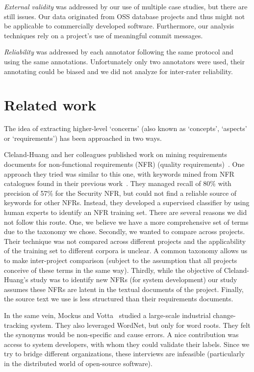 \documentclass[]{sig-alternate}
\begin{document}
\emph{External validity} was addressed by our use of multiple case studies, but there are still issues. 
Our data originated from OSS database projects and thus might not be applicable to commercially developed software. 
Furthermore, our analysis techniques rely on a project's use of meaningful commit messages. 

\emph{Reliability} was addressed by each annotator following the same protocol and using the same annotations. 
Unfortunately only two annotators were used, their annotating could be biased and we did not analyze for inter-rater reliability.


\section{Related work}
\label{sec:related}
The idea of extracting higher-level `concerns' (also known as `concepts', `aspects' or `requirements') has been approached in two ways. 

Cleland-Huang and her colleagues published work on mining requirements documents for non-functional requirements (NFR) (quality requirements)~\cite{Cleland-Huang2006}. One approach they tried was similar to this one, with keywords mined from NFR catalogues found in their previous work~\cite{chung99}. They managed recall of 80\% with precision of 57\% for the Security NFR, but could not find a reliable source of keywords for other NFRs. Instead, they developed a supervised classifier by using human experts to identify an NFR training set. There are several reasons we did not follow this route. One, we believe we have a more comprehensive set of terms due to the taxonomy we chose. Secondly, we wanted to compare across projects. Their technique was not compared across different projects and the applicability of the training set to different corpora is unclear. A common taxonomy allows us to make inter-project comparison (subject to the assumption that all projects conceive of these terms in the same way). Thirdly, while the objective of Cleland-Huang's study was to identify new NFRs (for system development) our study assumes these NFRs are latent in the textual documents of the project. Finally, the source text we use is less structured than their requirements documents.

In the same vein, Mockus and Votta~\cite{Mockus00} studied a large-scale industrial change-tracking system. They also leveraged WordNet, but only for word roots. They felt the synonyms would be non-specific and cause errors. A nice contribution was access to system developers, with whom they could validate their labels. Since we try to bridge different organizations, these interviews are infeasible (particularly in the distributed world of open-source software).
\end{document}
